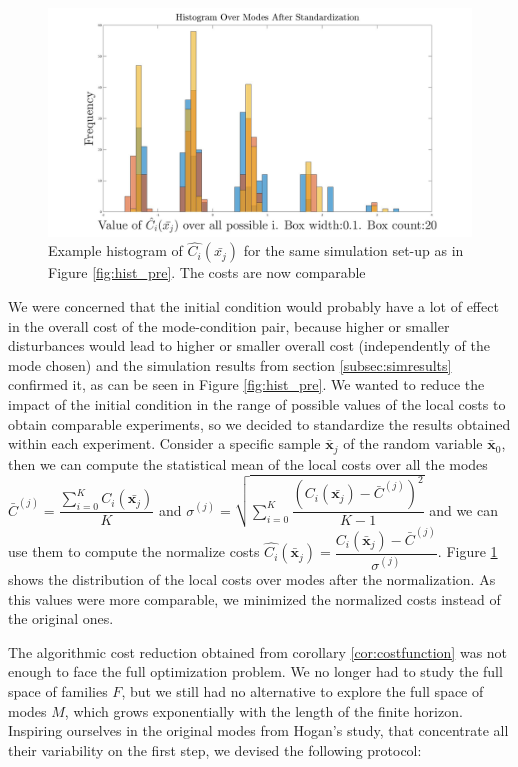 \documentclass[12,twoside]{TFG-GM}
\theoremstyle{definition}
\theoremstyle{remark}
\newcommand*\mean[1]{\bar{#1}}
\newcommand*\diff[1]{\bar{#1}}
\begin{document}
\begin{figure}[htb!]
\begin{center}
\includegraphics[width=16cm]{hist_after_std.jpg}
\caption{\label{fig:hist_post} \small Example histogram of $\hat{C_i}(\diff{x_j})$ for the same simulation set-up as in Figure \ref{fig:hist_pre}. The costs are now comparable}
\end{center}
\end{figure}

We were concerned that the initial condition would probably have a lot of effect in the overall cost of the mode-condition pair, because higher or smaller disturbances would lead to higher or smaller overall cost (independently of the mode chosen) and the simulation results from section \ref{subsec:simresults} confirmed it, as can be seen in Figure \ref{fig:hist_pre}. We wanted to reduce the impact of the initial condition in the range of possible values of the local costs to obtain comparable experiments, so we decided to standardize the results obtained within each experiment. Consider a specific sample $\diff{\textbf{x}}_j$ of the random variable $\diff{\textbf{x}}_0$, then we can compute the statistical mean of the local costs over all the modes $\mean{C}^{(j)} = \dfrac{\sum\limits_{i = 0}^{K}{C_i(\diff{\textbf{x}_j})}}{K}$ and $\sigma^{(j)} = \sqrt{\sum\limits_{i=0}^{K}{\dfrac{(C_i(\diff{\textbf{x}_j}) - \diff{C}^{(j)})^2} {K - 1}}}$ and we can use them to compute the normalize costs $\hat{C_i}(\diff{\textbf{x}}_j) = \dfrac{C_i(\diff{\textbf{x}}_{j}) - \diff{C}^{(j)}}{\sigma^{(j)}}$. Figure \ref{fig:hist_post} shows the distribution of the local costs over modes after the normalization. As this values were more comparable, we minimized the normalized costs instead of the original ones.

The algorithmic cost reduction obtained from corollary \ref{cor:costfunction} was not enough to face the full optimization problem. We no longer had to study the full space of families $F$, but we still had no alternative to explore the full space of modes $M$, which grows exponentially with the length of the finite horizon. Inspiring ourselves in the original modes from Hogan's study, that concentrate all their variability on the first step, we devised the following protocol:
\end{document}
